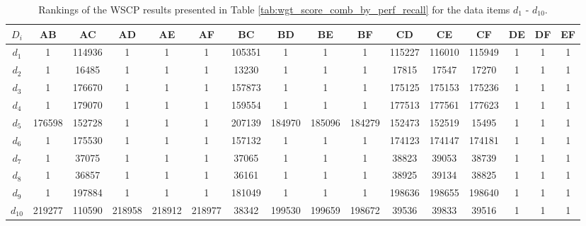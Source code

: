 \begin{table*}[t]
\caption{Rankings of the WSCP results presented in Table \ref{tab:wgt_score_comb_by_perf_recall} for the data items $d_{1}$ - $d_{10}$.}
\label{tab:rankings_wgt_comb_by_perf_recall}
\centering
\begin{adjustbox}{width=\textwidth}
\begin{tabular}{|c|c|c|c|c|c|c|c|c|c|c|c|c|c|c|c|}
\hline
$D_i$ & AB & AC & AD & AE & AF & BC & BD & BE & BF & CD & CE & CF & DE & DF & EF \\ 
\hline
$d_{1}$ & 1 & 114936 & 1 & 1 & 1 & 105351 & 1 & 1 & 1 & 115227 & 116010 & 115949 & 1 & 1 & 1 \\
$d_{2}$ & 1 & 16485 & 1 & 1 & 1 & 13230 & 1 & 1 & 1 & 17815 & 17547 & 17270 & 1 & 1 & 1 \\
$d_{3}$ & 1 & 176670 & 1 & 1 & 1 & 157873 & 1 & 1 & 1 & 175125 & 175153 & 175236 & 1 & 1 & 1 \\
$d_{4}$ & 1 & 179070 & 1 & 1 & 1 & 159554 & 1 & 1 & 1 & 177513 & 177561 & 177623 & 1 & 1 & 1 \\
$d_{5}$ & 176598 & 152728 & 1 & 1 & 1 & 207139 & 184970 & 185096 & 184279 & 152473 & 152519 & 15495 & 1 & 1 & 1 \\
$d_{6}$ & 1 & 175530 & 1 & 1 & 1 & 157132 & 1 & 1 & 1 & 174123 & 174147 & 174181 & 1 & 1 & 1 \\
$d_{7}$ & 1 & 37075 & 1 & 1 & 1 & 37065 & 1 & 1 & 1 & 38823 & 39053 & 38739 & 1 & 1 & 1 \\
$d_{8}$ & 1 & 36857 & 1 & 1 & 1 & 36161 & 1 & 1 & 1 & 38925 & 39134 & 38825 & 1 & 1 & 1 \\
$d_{9}$ & 1 & 197884 & 1 & 1 & 1 & 181049 & 1 & 1 & 1 & 198636 & 198655 & 198640 & 1 & 1 & 1 \\
$d_{10}$ & 219277 & 110590 & 218958 & 218912 & 218977 & 38342 & 199530 & 199659 & 198672 & 39536 & 39833 & 39516 & 1 & 1 & 1 \\
\hline
\end{tabular}
\end{adjustbox}
\end{table*}

